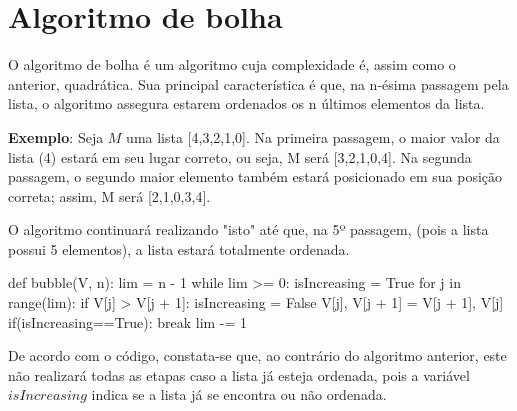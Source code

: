 \section{Algoritmo de bolha}
O algoritmo de bolha é um algoritmo cuja complexidade é, assim como o anterior, quadrática. Sua principal característica é que, na n-ésima passagem pela lista, o algoritmo assegura estarem ordenados os n últimos elementos da lista.

\textbf{Exemplo}: Seja $M$ uma lista [4,3,2,1,0].
Na primeira passagem, o maior valor da lista (4) estará em seu lugar correto, ou seja, M será [3,2,1,0,4]. Na segunda passagem, o segundo maior elemento também estará posicionado em sua posição correta; assim, M será [2,1,0,3,4].

O algoritmo continuará realizando "isto" até que, na 5º passagem, (pois a lista possui 5 elementos), a lista estará totalmente ordenada.

\begin{python}
def bubble(V, n):
    lim = n - 1
    while lim >= 0:
        isIncreasing = True
        for j in range(lim):
            if V[j] > V[j + 1]:
                isIncreasing = False
                V[j], V[j + 1] = V[j + 1], V[j]
        if(isIncreasing==True): 
                break
        lim -= 1
\end{python}

De acordo com o código, constata-se que, ao contrário do algoritmo anterior, este não realizará todas as etapas caso a lista já esteja ordenada, pois a variável $isIncreasing$ indica se a lista já se encontra ou não ordenada.